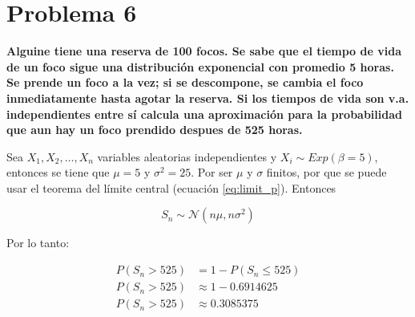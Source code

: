 \section*{Problema 6}

\textbf{Alguine tiene una reserva de 100 focos. Se sabe que el tiempo de vida de un foco sigue una distribución exponencial con promedio 5 horas. Se prende un foco a la vez; si se descompone, se cambia el foco inmediatamente hasta agotar la reserva. Si los tiempos de vida son v.a. independientes entre sí calcula una aproximación para la probabilidad que aun hay un foco prendido despues de 525 horas.}

Sea $X_1,X_2,\dots, X_n$ variables aleatorias independientes y $X_i \sim Exp(\beta=5)$, entonces se tiene que $\mu = 5$ y $\sigma^2 = 25$. Por ser $\mu$ y $\sigma$ finitos, por que se puede usar el teorema del límite central (ecuación \ref{eq:limit_p}). Entonces

\begin{equation*}
    S_n \sim \mathcal{N}(n\mu,n\sigma^2)
\end{equation*}

Por lo tanto:

\begin{align*}
    P(S_n > 525) & = 1 -P(S_n \leq 525)  \\
    P(S_n > 525) & \approx 1 - 0.6914625 \\
    P(S_n > 525) & \approx 0.3085375
\end{align*}